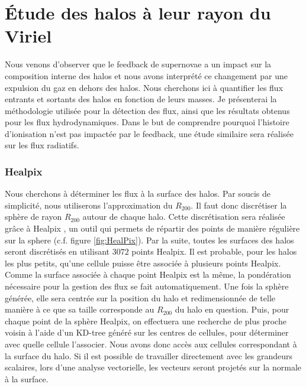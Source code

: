 \clearpage
\section{Étude des halos à leur rayon du Viriel}

Nous venons d'observer que le feedback de supernovae a un impact sur la composition interne des halos et nous avons interprété ce changement par une expulsion du gaz en dehors des halos.
Nous cherchons ici à quantifier les flux entrants et sortants des halos en fonction de leurs masses.
Je présenterai la méthodologie utilisée pour la détection des flux, ainsi que les résultats obtenus pour les flux hydrodynamiques.
Dans le but de comprendre pourquoi l'histoire d'ionisation n'est pas impactée par le feedback, une étude similaire sera réalisée sur les flux radiatifs.

\subsubsection{Healpix}
\label{sec:healpix}

Nous cherchons à déterminer les flux à la surface des halos.
Par soucis de simplicité, nous utiliserons l'approximation du $R_{200}$.
Il faut donc discrétiser la sphère de rayon $R_{200}$ autour de chaque halo.
Cette discrétisation sera réalisée grâce à Healpix \citep{gorski_healpix:_2005}, un outil qui permets de répartir des points de manière régulière sur la sphere (c.f. figure \ref{fig:HealPix}).
Par la suite, toutes les surfaces des halos seront discrétisés en utilisant $3072$ points Healpix.
Il est probable, pour les halos les plus petits, qu'une cellule puisse être associée à plusieurs points Healpix.
Comme la surface associée à chaque point Healpix est la même, la pondération nécessaire pour la gestion des flux se fait automatiquement.
Une fois la sphère générée, elle sera centrée sur la position du halo et redimensionnée de telle manière à ce que sa taille corresponde au $R_{200}$ du halo en question.
Puis, pour chaque point de la sphère Healpix, on effectuera une recherche de plus proche voisin à l'aide d'un KD-tree généré sur les centres de cellules, pour déterminer avec quelle cellule l'associer.
Nous avons donc accès aux cellules correspondant à la surface du halo.
Si il est possible de travailler directement avec les grandeurs scalaires, lors d'une analyse vectorielle, les vecteurs seront projetés sur la normale à la surface.


